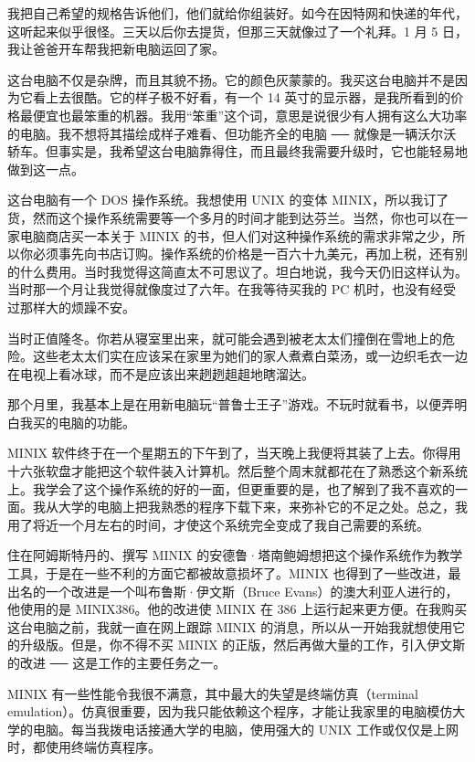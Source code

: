 我把自己希望的规格告诉他们，他们就给你组装好。如今在因特网和快递的年代，这听起来似乎很怪。三天以后你去提货，但那三天就像过了一个礼拜。1 月 5 日，我让爸爸开车帮我把新电脑运回了家。

这台电脑不仅是杂牌，而且其貌不扬。它的颜色灰蒙蒙的。我买这台电脑并不是因为它看上去很酷。它的样子极不好看，有一个 14 英寸的显示器，是我所看到的价格最便宜也最笨重的机器。我用“笨重”这个词，意思是说很少有人拥有这么大功率的电脑。我不想将其描绘成样子难看、但功能齐全的电脑 ── 就像是一辆沃尔沃轿车。但事实是，我希望这台电脑靠得住，而且最终我需要升级时，它也能轻易地做到这一点。

这台电脑有一个 DOS 操作系统。我想使用 UNIX 的变体 MINIX，所以我订了货，然而这个操作系统需要等一个多月的时间才能到达芬兰。当然，你也可以在一家电脑商店买一本关于 MINIX 的书，但人们对这种操作系统的需求非常之少，所以你必须事先向书店订购。操作系统的价格是一百六十九美元，再加上税，还有别的什么费用。当时我觉得这简直太不可思议了。坦白地说，我今天仍旧这样认为。当时那一个月让我觉得就像度过了六年。在我等待买我的 PC 机时，也没有经受过那样大的烦躁不安。

当时正值隆冬。你若从寝室里出来，就可能会遇到被老太太们撞倒在雪地上的危险。这些老太太们实在应该呆在家里为她们的家人煮煮白菜汤，或一边织毛衣一边在电视上看冰球，而不是应该出来趔趔趄趄地瞎溜达。

那个月里，我基本上是在用新电脑玩“普鲁士王子”游戏。不玩时就看书，以便弄明白我买的电脑的功能。

MINIX 软件终于在一个星期五的下午到了，当天晚上我便将其装了上去。你得用十六张软盘才能把这个软件装入计算机。然后整个周末就都花在了熟悉这个新系统上。我学会了这个操作系统的好的一面，但更重要的是，也了解到了我不喜欢的一面。我从大学的电脑上把我熟悉的程序下载下来，来弥补它的不足之处。总之，我用了将近一个月左右的时间，才使这个系统完全变成了我自己需要的系统。

住在阿姆斯特丹的、撰写 MINIX 的安德鲁·塔南鲍姆想把这个操作系统作为教学工具，于是在一些不利的方面它都被故意损坏了。MINIX 也得到了一些改进，最出名的一个改进是一个叫布鲁斯·伊文斯（Bruce Evans）的澳大利亚人进行的，他使用的是 MINIX386。他的改进使 MINIX 在 386 上运行起来更方便。在我购买这台电脑之前，我就一直在网上跟踪 MINIX 的消息，所以从一开始我就想使用它的升级版。但是，你不得不买 MINIX 的正版，然后再做大量的工作，引入伊文斯的改进 ── 这是工作的主要任务之一。

MINIX 有一些性能令我很不满意，其中最大的失望是终端仿真（terminal emulation）。仿真很重要，因为我只能依赖这个程序，才能让我家里的电脑模仿大学的电脑。每当我拨电话接通大学的电脑，使用强大的 UNIX 工作或仅仅是上网时，都使用终端仿真程序。

